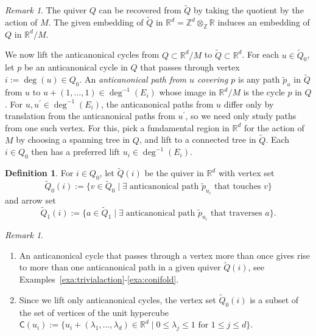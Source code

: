 \documentclass[11pt,a4paper]{amsart}
\numberwithin{equation}{section}
\theoremstyle{definition}
\newtheorem{definition}[theorem]{Definition}
\theoremstyle{remark}
\newtheorem{remark}[theorem]{Remark}
\newcommand{\RR}{\ensuremath{\mathbb{R}}}
\newcommand{\ZZ}{\ensuremath{\mathbb{Z}}}
\begin{document}
\begin{remark}
\label{rem:QinQuotient}
The quiver $Q$ can be recovered from $\widetilde{Q}$ by taking the quotient by the action of $M$. The given embedding of $\widetilde{Q}$ in $\RR^d=\ZZ^d\otimes_\ZZ \RR$ induces an embedding of $Q$ in $\RR^d/M$. 
\end{remark}



We now lift the anticanonical cycles from $Q\subset \RR^d/M$ to $\widetilde{Q}\subset \RR^d$. For each $u\in \widetilde{Q}_0$, let $p$ be an anticanonical cycle in $Q$ that passes through vertex $i:=\deg(u)\in Q_0$. An \emph{anticanonical path from $u$ covering $p$} is any path $\widetilde{p}_u$ in $\widetilde{Q}$ from $u$ to $u +(1,\dots,1)\in \deg^{-1}(E_i)$ whose image in $\RR^d/M$ is the cycle $p$ in $Q$.  For $u, u^\prime\in \deg^{-1}(E_i)$, the anticanonical paths from $u$ differ only by translation from the anticanonical paths from $u^\prime$, so we need only study paths from one such vertex. For this, pick a fundamental region in $\RR^d$ for the action of $M$ by choosing a spanning tree in $Q$, and lift to a connected tree in $\widetilde{Q}$. Each $i\in Q_0$ then has a preferred lift $u_i\in \deg^{-1}(E_i)$.

\begin{definition}
\label{def:coveringquiver}
For $i\in Q_0$, let $\widetilde{Q}(i)$ be the quiver in $\RR^d$ with vertex set
\[
\widetilde{Q}_0(i):=\Big\{v\in \widetilde{Q}_0 \mid\exists\; \text{anticanonical path }\widetilde{p}_{u_i} \text{ that touches }v\Big\}
\]
and arrow set
\[
\widetilde{Q}_1(i):=\Big\{a\in \widetilde{Q}_1\mid\exists\; \text{anticanonical path }\widetilde{p}_{u_i} \text{ that traverses }a\Big\}.
\]
\end{definition}


\begin{remark}
\label{rem:widetildeQi}
\begin{enumerate}
\item An anticanonical cycle that passes through a vertex more than once gives rise to more than one anticanonical path in a given quiver $\widetilde{Q}(i)$, see Examples~\ref{exa:trivialaction}-\ref{exa:conifold}.
\item Since we lift only anticanonical cycles,  the vertex set $\widetilde{Q}_0(i)$ is a subset of the set of vertices of the unit hypercube 
$\mathsf{C}(u_i):=\{u_i+(\lambda_1,\dots,\lambda_d)\in \RR^d \mid 0\leq \lambda_j\leq 1 \text{ for }1\leq j\leq d\}$.
\end{enumerate}
\end{remark}
\end{document}

